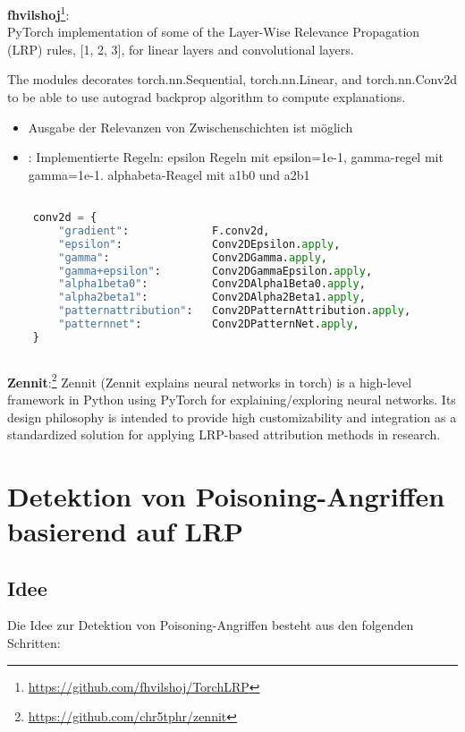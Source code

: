 \documentclass{article}
\theoremstyle{break}
\begin{document}
	\noindent \textbf{fhvilshoj}\footnote{\url{https://github.com/fhvilshoj/TorchLRP}}:\\
	
	
	
	\noindent PyTorch implementation of some of the Layer-Wise Relevance Propagation (LRP) rules, [1, 2, 3], for linear layers and convolutional layers.
	
	The modules decorates torch.nn.Sequential, torch.nn.Linear, and torch.nn.Conv2d to be able to use autograd backprop algorithm to compute explanations.
	\begin{itemize}
		\item Ausgabe der Relevanzen von Zwischenschichten ist möglich
		\item: Implementierte Regeln: epsilon Regeln mit epsilon=1e-1, gamma-regel mit gamma=1e-1. alphabeta-Reagel mit a1b0 und a2b1
	\end{itemize}

\begin{lstlisting}[language=Python, caption=Implementierte Regeln fhvilshoj]

	conv2d = {
		"gradient":             F.conv2d,
		"epsilon":              Conv2DEpsilon.apply,
		"gamma":                Conv2DGamma.apply,
		"gamma+epsilon":        Conv2DGammaEpsilon.apply,
		"alpha1beta0":          Conv2DAlpha1Beta0.apply,
		"alpha2beta1":          Conv2DAlpha2Beta1.apply,
		"patternattribution":   Conv2DPatternAttribution.apply,
		"patternnet":           Conv2DPatternNet.apply,
	}
	
\end{lstlisting}
	
	\noindent \textbf{Zennit}:\footnote{\url{https://github.com/chr5tphr/zennit}}
	Zennit (Zennit explains neural networks in torch) is a high-level framework in Python using PyTorch for explaining/exploring neural networks. Its design philosophy is intended to provide high customizability and integration as a standardized solution for applying LRP-based attribution methods in research.
	\section{Detektion von Poisoning-Angriffen basierend auf LRP}
	\subsection{Idee}
	Die Idee zur Detektion von Poisoning-Angriffen besteht aus den folgenden Schritten:
	
\end{document}
